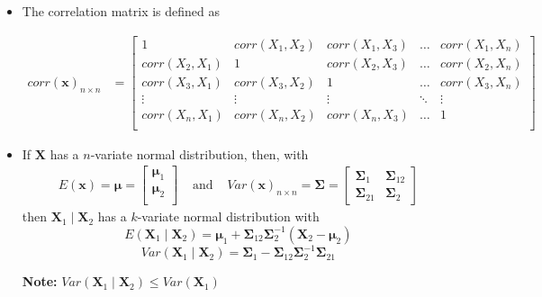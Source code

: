 \documentclass[10pt, twoside, a4paper]{book}
\theoremstyle{definition}
\begin{document}
\begin{itemize}
\item The correlation matrix is defined as

\begin{equation*}
\renewcommand{\arraystretch}{1.6}
\begin{array}{ll}

corr(\bm x)_{n \times n} & = 
\begin{bmatrix}
1 & corr(X_1, X_2) & corr(X_1, X_3) & \hdots & corr(X_1, X_n) \\
corr(X_2, X_1) & 1 & corr(X_2, X_3) & \hdots & corr(X_2, X_n) \\
corr(X_3, X_1) & corr(X_3, X_2) & 1 & \hdots & corr(X_3, X_n) \\
\vdots & \vdots & \vdots & \ddots  & \vdots \\
corr(X_n, X_1) & corr(X_n, X_2) & corr(X_n, X_3) & \hdots & 1 \\
\end{bmatrix}
\end{array}
\end{equation*}

\item If $\bm X$ has a $n$-variate normal distribution, then, with
\begin{equation*}
\renewcommand{\arraystretch}{1.6}
\begin{array}{lll}

E(\bm x) = 
\bm \mu =
\begin{bmatrix}
\bm \mu_1 \\ \bm \mu_2 \\
\end{bmatrix}

 & \text{ and } & 
 
 Var(\bm x)_{n \times n} = 
\bm \Sigma =
\begin{bmatrix}
\bm \Sigma_1 & \bm \Sigma_{12} \\
\bm \Sigma_{21} & \bm \Sigma_2
\end{bmatrix}

\end{array}
\end{equation*}
then $\bm X_1 \mid \bm X_2$ has a $k$-variate normal distribution with
$$E(\bm X_1 \mid \bm X_2) = \bm \mu_1 + \bm \Sigma_{12} \bm
\Sigma_2^{-1}(\bm X_2 - \bm \mu_2)$$
$$Var(\bm X_1 \mid \bm X_2) = \bm \Sigma_1 - \bm \Sigma_{12} \bm \Sigma_2^{-1}
\bm \Sigma_{21}$$
\item[\bf{Note:}] $Var(\bm X_1 \mid \bm X_2) \leq Var(\bm X_1)$

\end{itemize}
\end{document}
